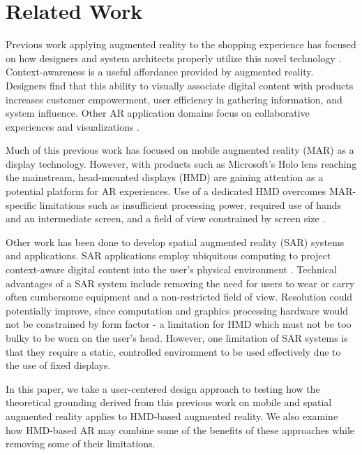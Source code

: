 \section{Related Work}

Previous work applying augmented reality to the shopping experience has focused on how designers and system architects properly utilize this novel technology \cite{ahn2015supporting,kourouthanassis2007enhancing,olsson2013expected,spreer2012improving,stoyanova2015comparison,zhu2004personalized}.  Context-awareness is a useful affordance provided by augmented reality.  Designers find that this ability to visually associate digital content with products increases customer empowerment, user efficiency in gathering information, and system influence.  Other AR application domains focus on collaborative experiences and visualizations \cite{esser2016head,santos2016augmented,truong2013today}.

Much of this previous work has focused on mobile augmented reality (MAR) as a display technology.   However, with products such as Microsoft's Holo lens reaching the mainstream, head-mounted displays (HMD) are gaining attention as a potential platform for AR experiences.  Use of a dedicated HMD overcomes MAR-specific limitations such as insufficient processing power, required use of hands and an intermediate screen, and a field of view constrained by screen size \cite{bimber2005spatial}.  

Other work has been done to develop spatial augmented reality (SAR) systems and applications.  SAR applications employ ubiquitous computing to project context-aware digital content into the user's physical environment \cite{benko2015fovear,benko2014dyadic}.  Technical advantages of a SAR system include removing the need for users to wear or carry often cumbersome equipment and a non-restricted field of view.  Resolution could potentially improve, since computation and graphics processing hardware would not be constrained by form factor - a limitation for HMD which must not be too bulky to be worn on the user's head.  However, one limitation of SAR systems is that they require a static, controlled environment to be used effectively due to the use of fixed displays. 

In this paper, we take a user-centered design approach to testing how the theoretical grounding derived from this previous work on mobile and spatial augmented reality applies to HMD-based augmented reality. We also examine how HMD-based AR may combine some of the benefits of these approaches while removing some of their limitations.
